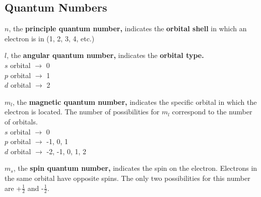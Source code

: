 \documentclass[a4paper, 12pt]{article}
\begin{document}
\subsection*{Quantum Numbers}

\textbf{$n$}, the \textbf{principle quantum number,} indicates the \textbf{orbital shell} in which an electron is in (1, 2, 3, 4, etc.)
 
\textbf{$l$}, the \textbf{angular quantum number,} indicates the \textbf{orbital type.}
\\
$s$ orbital $\xrightarrow{}$ 0
\\
$p$ orbital $\xrightarrow{}$ 1
\\
$d$ orbital $\xrightarrow{}$ 2
 
\textbf{$m_l$}, the \textbf{magnetic quantum number,} indicates the specific orbital in which the electron is located. The number of possibilities for $m_l$ correspond to the number of orbitals.
\\
$s$ orbital $\xrightarrow{}$ 0
\\
$p$ orbital $\xrightarrow{}$ -1, 0, 1
\\
$d$ orbital $\xrightarrow{}$ -2, -1, 0, 1, 2
 
\textbf{$m_s$}, the \textbf{spin quantum number,} indicates the spin on the electron. Electrons in the same orbital have opposite spins. The only two possibilities for this number are +$\frac{1}{2}$ and -$\frac{1}{2}$.
\end{document}
